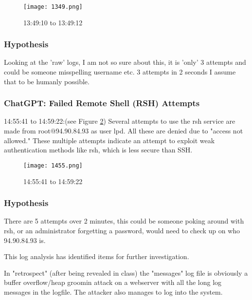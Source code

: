 \documentclass[
	letterpaper, %
	10pt, %
	unnumberedsections, %
	twoside, %
]{APAAssignment}
\begin{document}
\begin{figure}[!htp] %
	\centering
	\texttt{[image: 1349.png]}
	\caption{13:49:10 to 13:49:12}	\label{fig:1349}
\end{figure}



\subsubsection{Hypothesis}
Looking at the 'raw' logs, I am not so sure about this, it is 'only' 3 attempts and could be someone misspelling username etc. 3 attempts in 2 seconds I assume that to be humanly possible.

\subsubsection{ChatGPT: Failed Remote Shell (RSH) Attempts} 14:55:41 to 14:59:22:(see Figure \ref{fig:1455}) Several attempts to use the rsh service are made from root@94.90.84.93 as user lpd. All these are denied due to "access not allowed." These multiple attempts indicate an attempt to exploit weak authentication methods like rsh, which is less secure than SSH. \\

\begin{figure}[!htp] %
	\centering
	\texttt{[image: 1455.png]}
	\caption{14:55:41 to 14:59:22}	\label{fig:1455}
\end{figure}

\subsubsection{Hypothesis}
There are 5 attempts over 2 minutes, this could be someone poking around with rsh, or an administrator forgetting a password, would need to check up on who 94.90.84.93 is.

This log analysis has identified items for further investigation.

In "retrospect" (after being revealed in class) the "messages" log file is obviously a buffer overflow/heap groomin attack on a webserver with all the long log messages in the logfile. The attacker also manages to log into the system.

\clearpage
\printbibliography %
\end{document}
